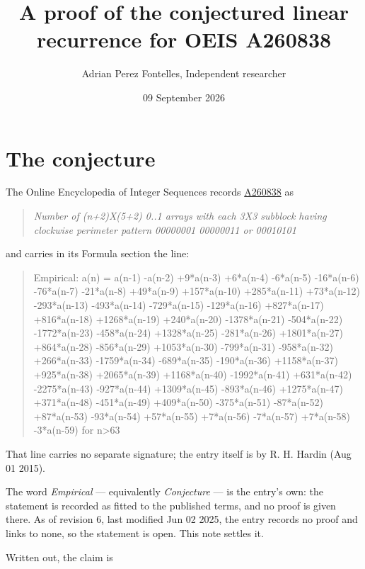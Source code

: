 \documentclass[11pt]{article}
\title{A proof of the conjectured linear recurrence for OEIS A260838}
\author{Adrian Perez Fontelles, Independent researcher}
\date{09 September 2026}
\theoremstyle{definition}
\begin{document}
\maketitle
\section{The conjecture}

The Online Encyclopedia of Integer Sequences records \href{https://oeis.org/A260838}{A260838} as

\begin{quote}\itshape Number of (n+2)X(5+2) 0..1 arrays with each 3X3 subblock having clockwise perimeter pattern 00000001 00000011 or 00010101\end{quote}

and carries in its Formula section the line:

\begin{quote}\ttfamily Empirical: a(n) = a(n-1) -a(n-2) +9*a(n-3) +6*a(n-4) -6*a(n-5) -16*a(n-6) -76*a(n-7) -21*a(n-8) +49*a(n-9) +157*a(n-10) +285*a(n-11) +73*a(n-12) -293*a(n-13) -493*a(n-14) -729*a(n-15) -129*a(n-16) +827*a(n-17) +816*a(n-18) +1268*a(n-19) +240*a(n-20) -1378*a(n-21) -504*a(n-22) -1772*a(n-23) -458*a(n-24) +1328*a(n-25) -281*a(n-26) +1801*a(n-27) +864*a(n-28) -856*a(n-29) +1053*a(n-30) -799*a(n-31) -958*a(n-32) +266*a(n-33) -1759*a(n-34) -689*a(n-35) -190*a(n-36) +1158*a(n-37) +925*a(n-38) +2065*a(n-39) +1168*a(n-40) -1992*a(n-41) +631*a(n-42) -2275*a(n-43) -927*a(n-44) +1309*a(n-45) -893*a(n-46) +1275*a(n-47) +371*a(n-48) -451*a(n-49) +409*a(n-50) -375*a(n-51) -87*a(n-52) +87*a(n-53) -93*a(n-54) +57*a(n-55) +7*a(n-56) -7*a(n-57) +7*a(n-58) -3*a(n-59) for n>63\end{quote}

That line carries no separate signature; the entry itself is by R. H. Hardin (Aug 01 2015).

The word {\itshape Empirical} --- equivalently {\itshape Conjecture} --- is the entry's own: the statement is recorded as fitted to the published terms, and no proof is given there. As of revision 6, last modified Jun 02 2025, the entry records no proof and links to none, so the statement is open. This note settles it.

Written out, the claim is
\end{document}
